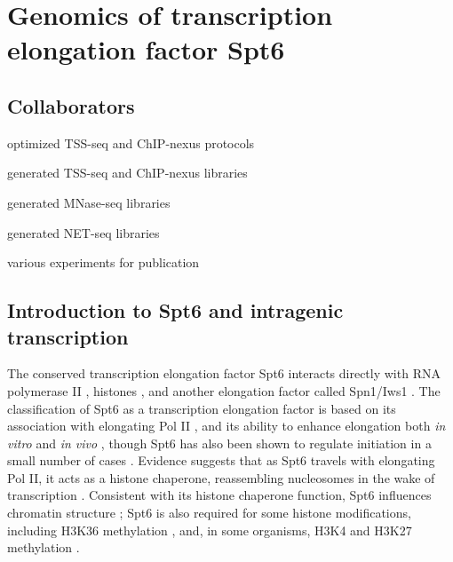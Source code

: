 \chapter{Genomics of transcription elongation factor Spt6}
\label{chapter:six}

\section{Collaborators}

\begin{description}[align=right, labelwidth=5cm, noitemsep]
    \item [Steve Doris] optimized TSS-seq and ChIP-nexus protocols
    \item [] generated TSS-seq and ChIP-nexus libraries
    \item [Olga Viktorovskaya] generated MNase-seq libraries
    \item [Magdalena Murawska] generated NET-seq libraries
    \item [Dan Spatt] various experiments for publication
\end{description}

\section{Introduction to Spt6 and intragenic transcription}

The conserved transcription elongation factor Spt6 interacts directly with RNA polymerase II \citep{close2011, diebold2011, liu2011, sdano2017, sun2010, yoh2007}, histones \citep{bortvin1996, mccullough2015}, and another elongation factor called Spn1/Iws1 \citep{diebold2010b, li2018, mcdonald2010}.
The classification of Spt6 as a transcription elongation factor is based on its association with elongating Pol II \citep{andrulis2000, ivanovska2011, kaplan2000, mayer2010}, and its ability to enhance elongation both \textit{in vitro} \citep{endoh2004} and \textit{in vivo} \citep{ardehali2009}, though Spt6 has also been shown to regulate initiation in a small number of cases \citep{adkins2006, ivanovska2011}.
Evidence suggests that as Spt6 travels with elongating Pol II, it acts as a histone chaperone, reassembling nucleosomes in the wake of transcription \citep{duina2011}.
Consistent with its histone chaperone function, Spt6 influences chromatin structure \citep{bortvin1996, degennaro2013, ivanovska2011, jeronimo2015, kaplan2003, perales2013, vanbakel2013}; Spt6 is also required for some histone modifications, including H3K36 methylation \citep{carrozza2005, chu2006, yoh2008, youdell2008}, and, in some organisms, H3K4 and H3K27 methylation \citep{begum2012, chen2012, degennaro2013, wang2017, wang2013}.

